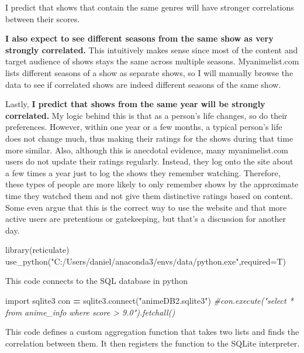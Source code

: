 \documentclass[
]{article}
\newenvironment{Shaded}{\begin{snugshade}}{\end{snugshade}}
\newcommand{\AttributeTok}[1]{\textcolor[rgb]{0.77,0.63,0.00}{#1}}
\newcommand{\CommentTok}[1]{\textcolor[rgb]{0.56,0.35,0.01}{\textit{#1}}}
\newcommand{\ExtensionTok}[1]{#1}
\newcommand{\FunctionTok}[1]{\textcolor[rgb]{0.00,0.00,0.00}{#1}}
\newcommand{\ImportTok}[1]{#1}
\newcommand{\NormalTok}[1]{#1}
\newcommand{\OperatorTok}[1]{\textcolor[rgb]{0.81,0.36,0.00}{\textbf{#1}}}
\newcommand{\StringTok}[1]{\textcolor[rgb]{0.31,0.60,0.02}{#1}}
\begin{document}
I predict that shows that contain the same genres will have stronger
correlations between their scores.

\textbf{I also expect to see different seasons from the same show as
very strongly correlated.} This intuitively makes sense since most of
the content and target audience of shows stays the same across multiple
seasons. Myanimelist.com lists different seasons of a show as separate
shows, so I will manually browse the data to see if correlated shows are
indeed different seasons of the same show.

Lastly, \textbf{I predict that shows from the same year will be strongly
correlated.} My logic behind this is that as a person's life changes, so
do their preferences. However, within one year or a few months, a
typical person's life does not change much, thus making their ratings
for the shows during that time more similar. Also, although this is
anecdotal evidence, many myanimelist.com users do not update their
ratings regularly. Instead, they log onto the site about a few times a
year just to log the shows they remember watching. Therefore, these
types of people are more likely to only remember shows by the
approximate time they watched them and not give them distinctive ratings
based on content. Some even argue that this is the correct way to use
the website and that more active users are pretentious or gatekeeping,
but that's a discussion for another day.

\begin{Shaded}
\begin{Highlighting}[]
\FunctionTok{library}\NormalTok{(reticulate)}
\FunctionTok{use\_python}\NormalTok{(}\StringTok{"C:/Users/daniel/anaconda3/envs/data/python.exe"}\NormalTok{,}\AttributeTok{required=}\NormalTok{T)}
\end{Highlighting}
\end{Shaded}

This code connects to the SQL database in python

\begin{Shaded}
\begin{Highlighting}[]
\ImportTok{import}\NormalTok{ sqlite3}
\NormalTok{con }\OperatorTok{=}\NormalTok{ sqlite3.}\ExtensionTok{connect}\NormalTok{(}\StringTok{"animeDB2.sqlite3"}\NormalTok{)}
\CommentTok{\#con.execute("select * from anime\_info where score \textgreater{} 9.0").fetchall()}
\end{Highlighting}
\end{Shaded}

This code defines a custom aggregation function that takes two lists and
finds the correlation between them. It then registers the function to
the SQLite interpreter.
\end{document}
